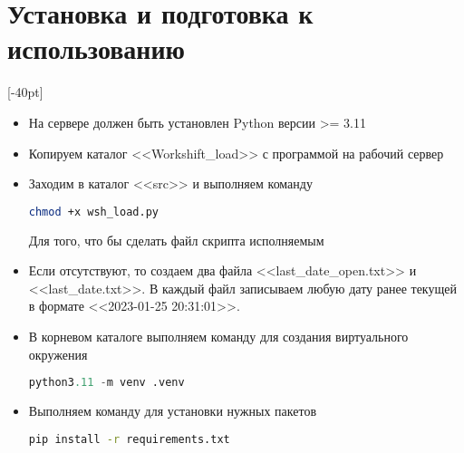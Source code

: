 \section{Установка и подготовка к использованию}

[-40pt]

\begin{itemize}
	\item На сервере должен быть установлен Python версии >= 3.11
	\item Копируем каталог <<Workshift\_load>> с программой на рабочий сервер
	\item  Заходим в каталог <<src>> и выполняем команду
	\begin{tcolorbox}
		
	\begin{lstlisting}[language=bash]
chmod +x wsh_load.py
	\end{lstlisting}
\end{tcolorbox}
	
	Для того, что бы сделать файл скрипта исполняемым
	
    \item Если отсутствуют, то создаем два файла <<last\_date\_open.txt>>
   и <<last\_date.txt>>.
   В каждый файл записываем любую дату ранее текущей в формате <<2023-01-25 20:31:01>>.

	\item В корневом каталоге выполняем команду для создания виртуального окружения
\begin{tcolorbox}
	
	\begin{lstlisting}[language=Python]
python3.11 -m venv .venv
	\end{lstlisting}
\end{tcolorbox}

   
	\item  Выполняем команду для установки нужных пакетов
\begin{tcolorbox}
	
	\begin{lstlisting}[language=bash]
pip install -r requirements.txt
	\end{lstlisting}
\end{tcolorbox}
    
    
    
	
	
\end{itemize}
